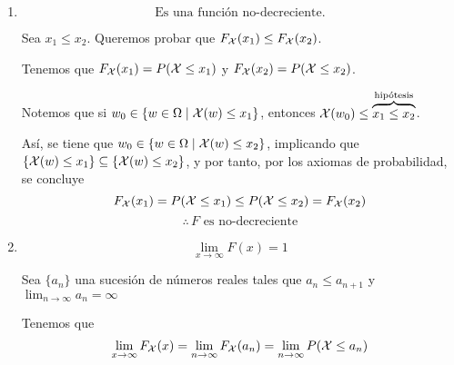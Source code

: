 \begin{enumerate}
  \item $$\text{Es una función no-decreciente.}$$
    \begin{myproof}
      Sea $x_1 \le x_2$. Queremos probar que $F_{\mathcal{X}}(x_1) \le F_{\mathcal{X}}(x_2)$.

      Tenemos que $F_{\mathcal{X}}(x_1) = P(\mathcal{X} \le x_1)$ y $F_{\mathcal{X}}(x_2) = P(\mathcal{X} \le x_2)$.

      Notemos que si $w_0 \in \{w \in \Omega \mid \mathcal{X}(w) \le x_1\}$, entonces $\mathcal{X}(w_0) \le \overbrace{x_1 \le x_2}^{\text{hipótesis}}$.

    Así, se tiene que $w_0 \in \{w \in \Omega \mid \mathcal{X}(w) \le x_2\}$, implicando que $\{\mathcal{X}(w) \le x_1\} \subseteq \{\mathcal{X}(w) \le x_2\}$, y por tanto, por los axiomas de probabilidad, se concluye
      \[F_{\mathcal{X}}(x_1) = P(\mathcal{X} \le x_1) \le P(\mathcal{X} \le x_2) = F_{\mathcal{X}}(x_2)\]
      \[\therefore \, \text{$F$ es no-decreciente}\]

    \end{myproof}
  \item \[ \lim_{x \to \infty} F(x) = 1 \]
    \begin{myproof}
      Sea $\{a_n\}$ una sucesión de números reales tales que $a_n \le a_{n+1}$ y $\lim_{n\to \infty} a_n = \infty$

      Tenemos que
      \[\lim_{x \to \infty} F_{\mathcal{X}}(x) = \lim_{n \to \infty} F_{\mathcal{X}}(a_n) = \lim_{n \to \infty} P(\mathcal{X} \le a_n)\]


\end{myproof}
\end{enumerate}
